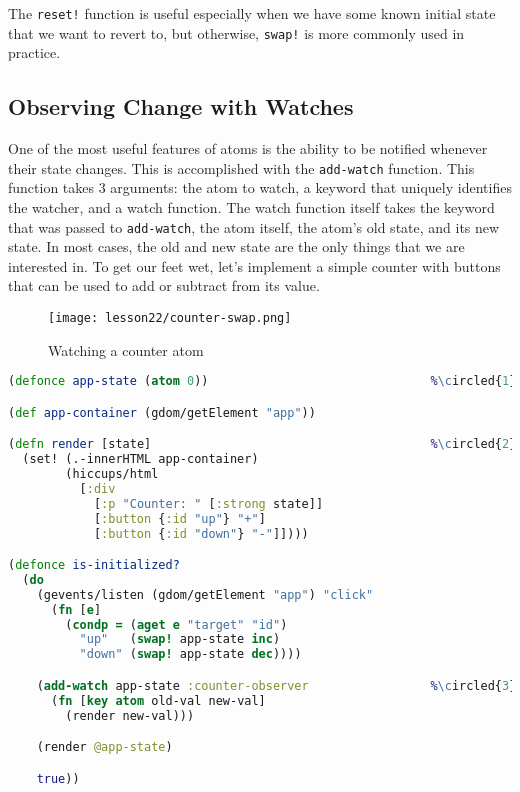 \documentclass[10pt,twoside,openright]{memoir}
\newcommand*\circled[1]{\tikz[baseline=(char.base)]{
            \node[shape=circle,draw,inner sep=1pt] (char) {#1};}}
\begin{document}
The \texttt{reset!} function is useful especially when we have some
known initial state that we want to revert to, but otherwise,
\texttt{swap!} is more commonly used in practice.


\subsection{Observing Change with Watches}

One of the most useful features of atoms is the ability to be notified
whenever their state changes. This is accomplished with the
\texttt{add-watch} function. This function takes 3 arguments: the atom
to watch, a keyword that uniquely identifies the watcher, and a watch
function. The watch function itself takes the keyword that was passed to
\texttt{add-watch}, the atom itself, the atom's old state, and its new
state. In most cases, the old and new state are the only things that we
are interested in. To get our feet wet, let's implement a simple counter
with buttons that can be used to add or subtract from its value.

\begin{figure}[H]
\caption{Watching a counter atom}
\centering
\texttt{[image: lesson22/counter-swap.png]}
\end{figure}

\begin{lstlisting}[language=Clojure, caption={Counter component}]
(defonce app-state (atom 0))                               %\circled{1}%

(def app-container (gdom/getElement "app"))

(defn render [state]                                       %\circled{2}%
  (set! (.-innerHTML app-container)
        (hiccups/html
          [:div
            [:p "Counter: " [:strong state]]
            [:button {:id "up"} "+"]
            [:button {:id "down"} "-"]])))

(defonce is-initialized?
  (do
    (gevents/listen (gdom/getElement "app") "click"
      (fn [e]
        (condp = (aget e "target" "id")
          "up"   (swap! app-state inc)
          "down" (swap! app-state dec))))

    (add-watch app-state :counter-observer                 %\circled{3}%
      (fn [key atom old-val new-val]
        (render new-val)))

    (render @app-state)

    true))
\end{lstlisting}
\end{document}
